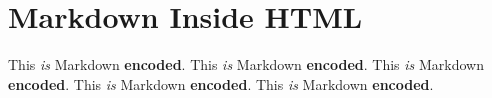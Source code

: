 
\def\mytitle{Markdown in HTML Test}
\def\latexmode{memoir}

\chapter{Markdown Inside HTML}
\label{markdowninsidehtml}
This \emph{is} Markdown \textbf{encoded}.
This \emph{is} Markdown \textbf{encoded}.
This \emph{is} Markdown \textbf{encoded}.
This \emph{is} Markdown \textbf{encoded}.
This \emph{is} Markdown \textbf{encoded}.




